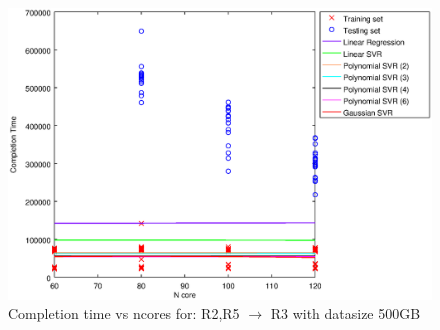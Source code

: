 
\begin {figure}[hbtp]
\centering
\includegraphics[width=\textwidth]{output/R2_R5_VS_R3_500_ALL_FEATURES/plot_R2_R5_VS_R3_500.eps}
\caption{Completion time vs ncores for: R2,R5 $\rightarrow$ R3 with datasize 500GB}
\label{fig:coreonly_linear_R2,R5_R3_500}
\end {figure}
